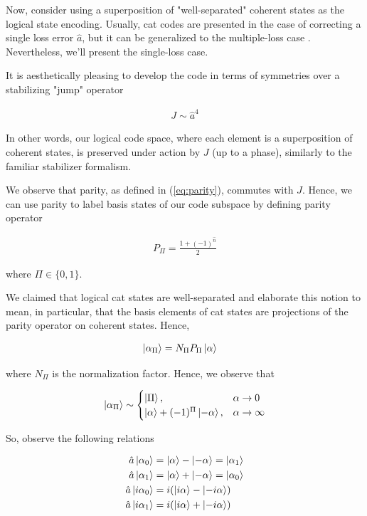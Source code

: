 \documentclass[12]{amsart}
\newcommand\0{\mathbf{0}}
\newcommand\<{\langle}
\renewcommand\>{\rangle}
\begin{document}
Now, consider using a superposition of "well-separated" coherent states as the logical state encoding. Usually, cat codes are presented in the case of correcting a single loss error $\hat{a}$, but it can be generalized to the multiple-loss case \cite{albert2018multimode}. Nevertheless, we'll present the single-loss case.

It is aesthetically pleasing to develop the code in terms of symmetries over a stabilizing "jump" operator 

\begin{align}
\label{eq:single-jump}
J \sim \hat{a}^4	
\end{align}

In other words, our logical code space, where each element is a superposition of coherent states, is preserved under action by $J$ (up to a phase), similarly to the familiar stabilizer formalism.

We observe that parity, as defined in (\ref{eq:parity}), commutes with $J$. Hence, we can use parity to label basis states of our code subspace by defining parity operator

\begin{align*}
P_{\Pi} = \frac{1+(-1)^{\hat{n}}}{2}	
\end{align*}

where $\Pi \in \{0, 1\}$.

We claimed that logical cat states are well-separated and elaborate this notion to mean, in particular, that the basis elements of cat states are projections of the parity operator on coherent states. Hence,

\begin{align*}
\ket{\alpha_\Pi} &= N_\Pi P_\Pi \ket{\alpha}
\end{align*}

where $N_\Pi$ is the normalization factor. Hence, we observe that

\begin{align*}
\ket{\alpha_\Pi} \sim \begin{cases} \ket{\Pi},  &\alpha \rightarrow 0\\ \ket{\alpha} + (-1)^\Pi \ket{-\alpha}, &\alpha \rightarrow \infty \end{cases}
\end{align*}

So, observe the following relations

\begin{align}
\label{eq:cat-rels}
\begin{split}
\hat{a} \ket{\alpha_0} &= \ket{\alpha} - \ket{-\alpha} = \ket{\alpha_1} \\
\hat{a} \ket{\alpha_1} &= \ket{\alpha} + \ket{-\alpha} = \ket{\alpha_0} \\
\hat{a} \ket{i\alpha_0} &= i(\ket{i\alpha} - \ket{-i\alpha})\\
\hat{a} \ket{i\alpha_1} &= i(\ket{i\alpha}  + \ket{-i\alpha})
\end{split}
\end{align}
\end{document}

